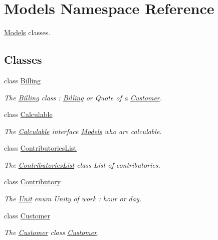 \hypertarget{namespaceModels}{\section{Models Namespace Reference}
\label{namespaceModels}
}


\hyperlink{namespaceModels}{Models} classes.  


\subsection*{Classes}
\begin{DoxyCompactItemize}
\item 
class \hyperlink{classModels_1_1Billing}{Billing}
\begin{DoxyCompactList}\small\item\em The \hyperlink{classModels_1_1Billing}{Billing} class \-: \hyperlink{classModels_1_1Billing}{Billing} or Quote of a \hyperlink{classModels_1_1Customer}{Customer}. \end{DoxyCompactList}\item 
class \hyperlink{classModels_1_1Calculable}{Calculable}
\begin{DoxyCompactList}\small\item\em The \hyperlink{classModels_1_1Calculable}{Calculable} interface \hyperlink{namespaceModels}{Models} who are calculable. \end{DoxyCompactList}\item 
class \hyperlink{classModels_1_1ContributoriesList}{Contributories\-List}
\begin{DoxyCompactList}\small\item\em The \hyperlink{classModels_1_1ContributoriesList}{Contributories\-List} class List of contributories. \end{DoxyCompactList}\item 
class \hyperlink{classModels_1_1Contributory}{Contributory}
\begin{DoxyCompactList}\small\item\em The \hyperlink{classModels_1_1Unit}{Unit} enum Unity of work \-: hour or day. \end{DoxyCompactList}\item 
class \hyperlink{classModels_1_1Customer}{Customer}
\begin{DoxyCompactList}\small\item\em The \hyperlink{classModels_1_1Customer}{Customer} class \hyperlink{classModels_1_1Customer}{Customer}. \end{DoxyCompactList}\item 

\end{DoxyCompactItemize}
